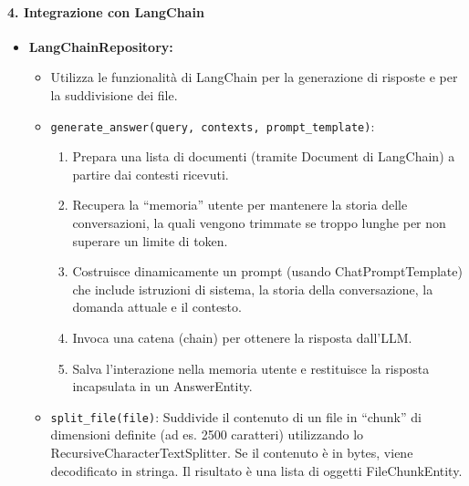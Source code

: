 \paragraph{4. Integrazione con LangChain}
\begin{itemize}
    \item \textbf{LangChainRepository:}
    \begin{itemize}
        \item Utilizza le funzionalità di LangChain per la generazione di risposte e per la suddivisione dei file.
        \item \texttt{generate\_answer(query, contexts, prompt\_template)}:
        \begin{enumerate}
            \item Prepara una lista di documenti (tramite Document di LangChain) a partire dai contesti ricevuti.
            \item Recupera la “memoria” utente per mantenere la storia delle conversazioni, la quali vengono trimmate se troppo lunghe per non superare un limite di token.
            \item Costruisce dinamicamente un prompt (usando ChatPromptTemplate) che include istruzioni di sistema, la storia della conversazione, la domanda attuale e il contesto.
            \item Invoca una catena (chain) per ottenere la risposta dall’LLM.
            \item Salva l’interazione nella memoria utente e restituisce la risposta incapsulata in un AnswerEntity.
        \end{enumerate}
        \item \texttt{split\_file(file)}: Suddivide il contenuto di un file in “chunk” di dimensioni definite (ad es. 2500 caratteri) utilizzando lo RecursiveCharacterTextSplitter. Se il contenuto è in bytes, viene decodificato in stringa. Il risultato è una lista di oggetti FileChunkEntity.
    \end{itemize}
\end{itemize}

